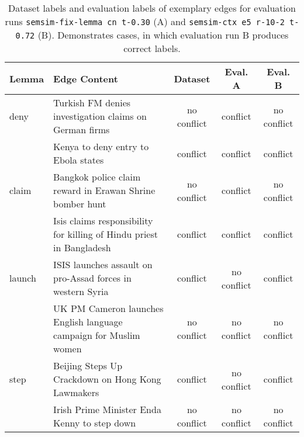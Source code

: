 \documentclass[11pt, numbers=noenddot]{scrreprt}
\begin{document}
\begin{table}[htp]
\centering
\begin{tabular}{l p{6cm} ccc}
\toprule
Lemma & Edge Content & Dataset & Eval. A & Eval. B \\
\midrule
deny	& Turkish FM denies investigation claims on German firms & no conflict & conflict & no conflict \\
\cline{2-5}
		& Kenya to deny entry to Ebola states & conflict & conflict & conflict \\

\hline
claim	& Bangkok police claim reward in Erawan Shrine bomber hunt & no conflict & conflict & no conflict \\
\cline{2-5}
		& Isis claims responsibility for killing of Hindu priest in Bangladesh & conflict & conflict & conflict \\

\hline
launch 	& ISIS launches assault on pro-Assad forces in western Syria & conflict & no conflict & conflict \\
\cline{2-5}
		& UK PM Cameron launches English language campaign for Muslim women & no conflict & no conflict & no conflict \\
\hline
step 	& Beijing Steps Up Crackdown on Hong Kong Lawmakers & conflict & no conflict & conflict \\
\cline{2-5}
		& Irish Prime Minister Enda Kenny to step down & no conflict & no conflict & no conflict \\
\bottomrule
\end{tabular}
\caption{Dataset labels and evaluation labels of exemplary edges for evaluation runs \texttt{semsim-fix-lemma cn t-0.30} (A) and \texttt{semsim-ctx e5 r-10-2 t-0.72} (B). Demonstrates cases, in which evaluation run B produces correct labels.}
\label{tab:example-edge-labels-eval-b-win}
\end{table}
\end{document}
